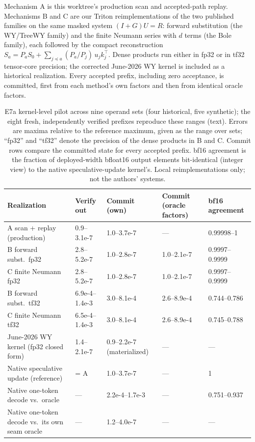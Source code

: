 \documentclass[conference]{IEEEtran}
\begin{document}
Mechanism A is this worktree's production scan and accepted-path replay. Mechanisms B and C are our Triton reimplementations of the two published families on the same masked system $(I+G)U=R$: forward substitution (the WY/TreeWY family) and the finite Neumann series with $d$ terms (the Bole family), each followed by the compact reconstruction $S_a=P_aS_0+\sum_{j\preceq a}(P_a/P_j)\,u_jk_j^\top$. Dense products run either in fp32 or in tf32 tensor-core precision; the corrected June-2026 WY kernel is included as a historical realization. Every accepted prefix, including zero acceptance, is committed, first from each method's own factors and then from identical oracle factors.

\begin{table}[t]
\caption{E7a kernel-level pilot across nine operand sets (four historical, five synthetic); the eight fresh, independently verified prefixes reproduce these ranges (text). Errors are maxima relative to the reference maximum, given as the range over sets; ``fp32'' and ``tf32'' denote the precision of the dense products in B and C. Commit rows compare the committed state for every accepted prefix. bf16 agreement is the fraction of deployed-width bfloat16 output elements bit-identical (integer view) to the native speculative-update kernel's. Local reimplementations only; not the authors' systems.}
\label{tab:e7a}
\centering\small
\begin{tabularx}{\textwidth}{@{}p{}YYYY@{}}
\toprule
Realization & Verify out & Commit (own) & Commit (oracle factors) & bf16 agreement \\
\midrule
A scan + replay (production) & 0.9--3.1e-7 & 1.0--3.7e-7 & --- & 0.99998--1 \\
B forward subst.\ fp32 & 2.8--5.2e-7 & 1.0--2.8e-7 & 1.0--2.1e-7 & 0.9997--0.9999 \\
C finite Neumann fp32 & 2.8--5.2e-7 & 1.0--2.8e-7 & 1.0--2.1e-7 & 0.9997--0.9999 \\
B forward subst.\ tf32 & 6.9e-4--1.4e-3 & 3.0--8.1e-4 & 2.6--8.9e-4 & 0.744--0.786 \\
C finite Neumann tf32 & 6.5e-4--1.4e-3 & 3.0--8.1e-4 & 2.6--8.9e-4 & 0.745--0.788 \\
June-2026 WY kernel (fp32 closed form) & 1.4--2.1e-7 & 0.9--2.2e-7 (materialized) & --- & --- \\
\midrule
Native speculative update (reference) & = A & 1.0--3.7e-7 & --- & 1 \\
Native one-token decode vs.\ oracle & --- & 2.2e-4--1.7e-3 & --- & 0.751--0.937 \\
Native one-token decode vs.\ its own seam oracle & --- & 1.2--4.0e-7 & --- & --- \\
\bottomrule
\end{tabularx}
\end{table}
\end{document}
